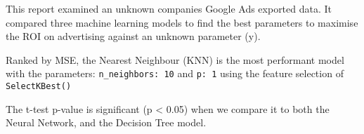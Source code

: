 \documentclass[11pt]{article}
\begin{document}
This report examined an unknown companies Google Ads exported data. It
compared three machine learning models to find the best parameters to
maximise the ROI on advertising against an unknown parameter (y).

Ranked by MSE, the Nearest Neighbour (KNN) is the most performant model
with the parameters: \texttt{n\_neighbors:\ 10} and \texttt{p:\ 1} using
the feature selection of \texttt{SelectKBest()}

The t-test p-value is significant (p \textless{} 0.05) when we compare
it to both the Neural Network, and the Decision Tree model.


    
    
    
    
\end{document}
